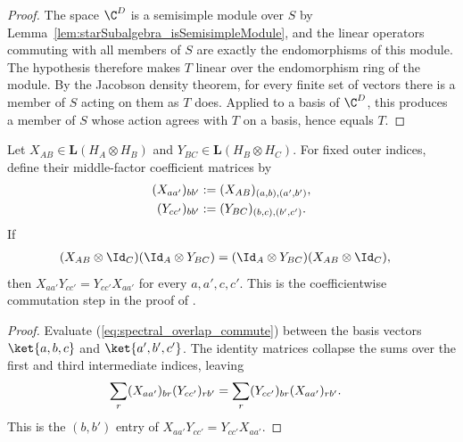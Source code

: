 \begin{proof}
    \leanok
    The space $\C^D$ is a semisimple module over $S$ by
    Lemma~\ref{lem:starSubalgebra_isSemisimpleModule}, and the linear
    operators commuting with all members of $S$ are exactly the
    endomorphisms of this module. The hypothesis therefore makes $T$ linear
    over the endomorphism ring of the module. By the Jacobson density
    theorem, for every finite set of vectors there is a member of $S$ acting
    on them as $T$ does. Applied to a basis of $\C^D$, this produces a
    member of $S$ whose action agrees with $T$ on a basis, hence equals $T$.
\end{proof}

\begin{theorem}%
    \label{thm:commuting_overlapping_middle_coefficients}
    \leanok
    Let $X_{AB}\in\mathbf L(H_A\otimes H_B)$ and
    $Y_{BC}\in\mathbf L(H_B\otimes H_C)$. For fixed outer indices, define
    their middle-factor coefficient matrices by
    \begin{align}
        (X_{aa'})_{bb'}
        &:=(X_{AB})_{(a,b),(a',b')}, \notag\\
        (Y_{cc'})_{bb'}
        &:=(Y_{BC})_{(b,c),(b',c')}.
        \notag
    \end{align}
    If
    \begin{align}
        (X_{AB}\otimes\Id_C)(\Id_A\otimes Y_{BC})
        &=(\Id_A\otimes Y_{BC})(X_{AB}\otimes\Id_C),
        \label{eq:spectral_overlap_commute}
    \end{align}
    then $X_{aa'}Y_{cc'}=Y_{cc'}X_{aa'}$ for every $a,a',c,c'$. This is
    the coefficientwise commutation step in the proof of
    \cite[Lemma~2.1]{Beigi2012Classification}.
\end{theorem}

\begin{proof}
    \leanok
    Evaluate (\ref{eq:spectral_overlap_commute}) between the basis vectors
    $\ket{a,b,c}$ and $\ket{a',b',c'}$. The identity matrices collapse the
    sums over the first and third intermediate indices, leaving
    \begin{align}
        \sum_r(X_{aa'})_{br}(Y_{cc'})_{rb'}
        &=\sum_r(Y_{cc'})_{br}(X_{aa'})_{rb'}.
        \notag
    \end{align}
    This is the $(b,b')$ entry of
    $X_{aa'}Y_{cc'}=Y_{cc'}X_{aa'}$.
\end{proof}

